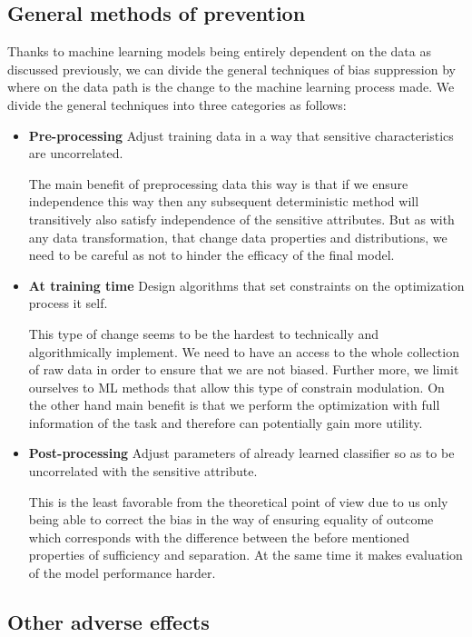\subsection{General methods of prevention}
Thanks to machine learning models being entirely dependent on the data as discussed previously, we can divide the general techniques of bias suppression by where on the data path is the change to the machine learning process made. We divide the general techniques into three categories as follows:
\begin{itemize}

    \item \textbf{Pre-processing}
    Adjust training data in a way that sensitive characteristics are uncorrelated. 
    
    The main benefit of preprocessing data this way is that if we ensure independence this way then any subsequent deterministic method will transitively also satisfy independence of the sensitive attributes.
    But as with any data transformation, that change data properties and distributions, we need to be careful as not to hinder the efficacy of the final model.
    
    \item \textbf{At training time}
    Design algorithms that set constraints on the optimization process it self.
    
    This type of change seems to be the hardest to technically and algorithmically implement. We need to have an access to the whole collection of raw data in order to ensure that we are not biased. Further more, we limit ourselves to ML methods that allow this type of constrain modulation. On the other hand main benefit is that we perform the optimization with full information of the task and therefore can potentially gain more utility.
    
    
    \item \textbf{Post-processing}
    Adjust parameters of already learned classifier so as to be uncorrelated with the sensitive attribute.
    
    This is the least favorable from the theoretical point of view due to us only being able to correct the bias in the way of ensuring equality of outcome which corresponds with the difference between the before mentioned properties of sufficiency and separation. At the same time it makes evaluation of the model performance harder.
\end{itemize}


\subsection{Other adverse effects}

